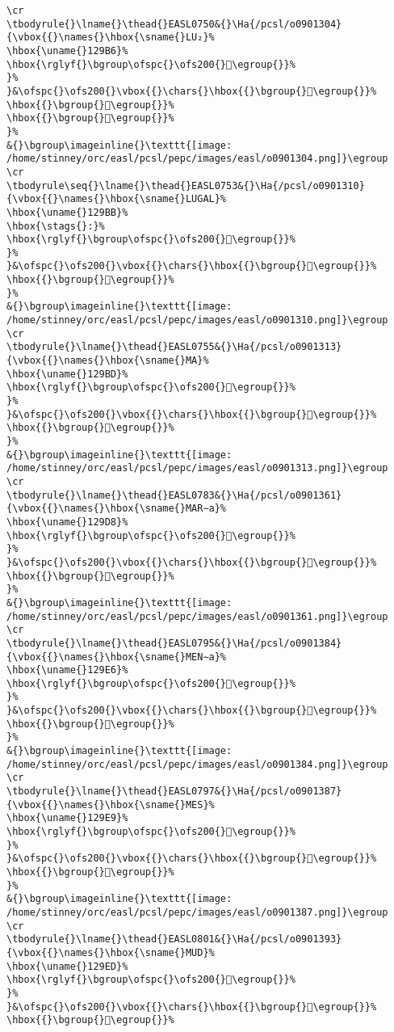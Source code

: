 \begin{verbatim}
\cr
\tbodyrule{}\lname{}\thead{}EASL0750&{}\Ha{/pcsl/o0901304}{\vbox{{}\names{}\hbox{\sname{}LU₂}%
\hbox{\uname{}129B6}%
\hbox{\rglyf{}\bgroup\ofspc{}\ofs200{}𒦶\egroup{}}%
}%
}&\ofspc{}\ofs200{}\vbox{{}\chars{}\hbox{{}\bgroup{}𒦹\egroup{}}%
\hbox{{}\bgroup{}𒦶\egroup{}}%
\hbox{{}\bgroup{}𒦸\egroup{}}%
}%
&{}\bgroup\imageinline{}\texttt{[image: /home/stinney/orc/easl/pcsl/pepc/images/easl/o0901304.png]}\egroup
\cr
\tbodyrule\seq{}\lname{}\thead{}EASL0753&{}\Ha{/pcsl/o0901310}{\vbox{{}\names{}\hbox{\sname{}LUGAL}%
\hbox{\uname{}129BB}%
\hbox{\stags{}:}%
\hbox{\rglyf{}\bgroup\ofspc{}\ofs200{}𒦻\egroup{}}%
}%
}&\ofspc{}\ofs200{}\vbox{{}\chars{}\hbox{{}\bgroup{}𒦺\egroup{}}%
\hbox{{}\bgroup{}𒦻\egroup{}}%
}%
&{}\bgroup\imageinline{}\texttt{[image: /home/stinney/orc/easl/pcsl/pepc/images/easl/o0901310.png]}\egroup
\cr
\tbodyrule{}\lname{}\thead{}EASL0755&{}\Ha{/pcsl/o0901313}{\vbox{{}\names{}\hbox{\sname{}MA}%
\hbox{\uname{}129BD}%
\hbox{\rglyf{}\bgroup\ofspc{}\ofs200{}𒦽\egroup{}}%
}%
}&\ofspc{}\ofs200{}\vbox{{}\chars{}\hbox{{}\bgroup{}𒦽\egroup{}}%
\hbox{{}\bgroup{}𒧀\egroup{}}%
}%
&{}\bgroup\imageinline{}\texttt{[image: /home/stinney/orc/easl/pcsl/pepc/images/easl/o0901313.png]}\egroup
\cr
\tbodyrule{}\lname{}\thead{}EASL0783&{}\Ha{/pcsl/o0901361}{\vbox{{}\names{}\hbox{\sname{}MAR∼a}%
\hbox{\uname{}129D8}%
\hbox{\rglyf{}\bgroup\ofspc{}\ofs200{}𒧘\egroup{}}%
}%
}&\ofspc{}\ofs200{}\vbox{{}\chars{}\hbox{{}\bgroup{}𒧘\egroup{}}%
\hbox{{}\bgroup{}𒧚\egroup{}}%
}%
&{}\bgroup\imageinline{}\texttt{[image: /home/stinney/orc/easl/pcsl/pepc/images/easl/o0901361.png]}\egroup
\cr
\tbodyrule{}\lname{}\thead{}EASL0795&{}\Ha{/pcsl/o0901384}{\vbox{{}\names{}\hbox{\sname{}MEN∼a}%
\hbox{\uname{}129E6}%
\hbox{\rglyf{}\bgroup\ofspc{}\ofs200{}𒧦\egroup{}}%
}%
}&\ofspc{}\ofs200{}\vbox{{}\chars{}\hbox{{}\bgroup{}𒧥\egroup{}}%
\hbox{{}\bgroup{}𒧦\egroup{}}%
}%
&{}\bgroup\imageinline{}\texttt{[image: /home/stinney/orc/easl/pcsl/pepc/images/easl/o0901384.png]}\egroup
\cr
\tbodyrule{}\lname{}\thead{}EASL0797&{}\Ha{/pcsl/o0901387}{\vbox{{}\names{}\hbox{\sname{}MES}%
\hbox{\uname{}129E9}%
\hbox{\rglyf{}\bgroup\ofspc{}\ofs200{}𒧩\egroup{}}%
}%
}&\ofspc{}\ofs200{}\vbox{{}\chars{}\hbox{{}\bgroup{}𒧨\egroup{}}%
\hbox{{}\bgroup{}𒧩\egroup{}}%
}%
&{}\bgroup\imageinline{}\texttt{[image: /home/stinney/orc/easl/pcsl/pepc/images/easl/o0901387.png]}\egroup
\cr
\tbodyrule{}\lname{}\thead{}EASL0801&{}\Ha{/pcsl/o0901393}{\vbox{{}\names{}\hbox{\sname{}MUD}%
\hbox{\uname{}129ED}%
\hbox{\rglyf{}\bgroup\ofspc{}\ofs200{}𒧭\egroup{}}%
}%
}&\ofspc{}\ofs200{}\vbox{{}\chars{}\hbox{{}\bgroup{}𒧭\egroup{}}%
\hbox{{}\bgroup{}𒧮\egroup{}}%

\end{verbatim}
